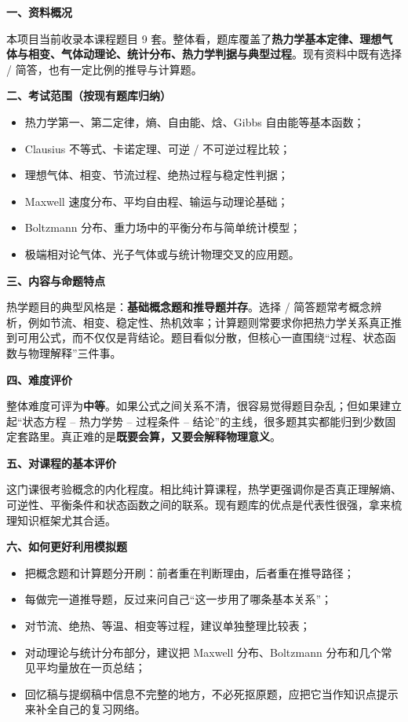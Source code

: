 ﻿

\textbf{一、资料概况}

本项目当前收录本课程题目 9 套。整体看，题库覆盖了\textbf{热力学基本定律、理想气体与相变、气体动理论、统计分布、热力学判据与典型过程}。现有资料中既有选择 / 简答，也有一定比例的推导与计算题。

\textbf{二、考试范围（按现有题库归纳）}
\begin{itemize}[leftmargin=2em,itemsep=0.2em,topsep=0.2em]
  \item 热力学第一、第二定律，熵、自由能、焓、Gibbs 自由能等基本函数；
  \item Clausius 不等式、卡诺定理、可逆 / 不可逆过程比较；
  \item 理想气体、相变、节流过程、绝热过程与稳定性判据；
  \item Maxwell 速度分布、平均自由程、输运与动理论基础；
  \item Boltzmann 分布、重力场中的平衡分布与简单统计模型；
  \item 极端相对论气体、光子气体或与统计物理交叉的应用题。
\end{itemize}

\textbf{三、内容与命题特点}

热学题目的典型风格是：\textbf{基础概念题和推导题并存}。选择 / 简答题常考概念辨析，例如节流、相变、稳定性、热机效率；计算题则常要求你把热力学关系真正推到可用公式，而不仅仅是背结论。题目看似分散，但核心一直围绕“过程、状态函数与物理解释”三件事。

\textbf{四、难度评价}

整体难度可评为\textbf{中等}。如果公式之间关系不清，很容易觉得题目杂乱；但如果建立起“状态方程 -- 热力学势 -- 过程条件 -- 结论”的主线，很多题其实都能归到少数固定套路里。真正难的是\textbf{既要会算，又要会解释物理意义}。

\textbf{五、对课程的基本评价}

这门课很考验概念的内化程度。相比纯计算课程，热学更强调你是否真正理解熵、可逆性、平衡条件和状态函数之间的联系。现有题库的优点是代表性很强，拿来梳理知识框架尤其合适。

\textbf{六、如何更好利用模拟题}
\begin{itemize}[leftmargin=2em,itemsep=0.2em,topsep=0.2em]
  \item 把概念题和计算题分开刷：前者重在判断理由，后者重在推导路径；
  \item 每做完一道推导题，反过来问自己“这一步用了哪条基本关系”；
  \item 对节流、绝热、等温、相变等过程，建议单独整理比较表；
  \item 对动理论与统计分布部分，建议把 Maxwell 分布、Boltzmann 分布和几个常见平均量放在一页总结；
  \item 回忆稿与提纲稿中信息不完整的地方，不必死抠原题，应把它当作知识点提示来补全自己的复习网络。
\end{itemize}

